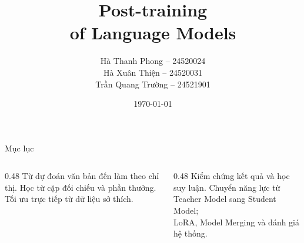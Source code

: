 \documentclass[11pt,aspectratio=169]{beamer}
\title[Post-training of Language Models]{Post-training\\of Language Models}
\author[Nhóm thực hiện]{%
  Hà Thanh Phong -- 24520024\\
  Hà Xuân Thiện -- 24520031\\
  Trần Quang Trường -- 24521901}
\institute{University of Information Technology -- VNUHCM}
\date{\today}
\begin{document}
\begin{frame}
  \titlepage
\end{frame}

\begin{frame}{Mục lục}
  \begin{columns}[T,onlytextwidth]
    \begin{column}{0.48\textwidth}
      \small Từ dự đoán văn bản đến làm theo chỉ thị.
      \vspace{0.25cm}
      \small Học từ cặp đối chiếu và phần thưởng.
      \vspace{0.25cm}
      \small Tối ưu trực tiếp từ dữ liệu sở thích.
    \end{column}
    \begin{column}{0.48\textwidth}
      \small Kiểm chứng kết quả và học suy luận.
      \vspace{0.25cm}
      \small Chuyển năng lực từ Teacher Model sang Student Model;\\
      LoRA, Model Merging và đánh giá hệ thống.
    \end{column}
  \end{columns}
\end{frame}






\end{document}
